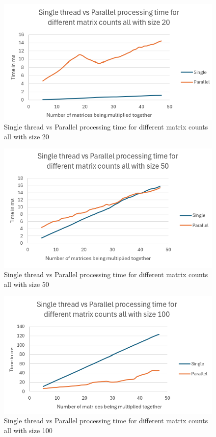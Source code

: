 \begin{figure}[H]
    \centering
    \includegraphics[width=1\columnwidth]{Figures/different_matrix_counts_size 20}
    \caption{Single thread vs Parallel processing time for different matrix counts all with size 20}
    \label{fig:different_matrix_counts_size 20}
\end{figure}

\begin{figure}[H]
    \centering
    \includegraphics[width=1\columnwidth]{Figures/different_matrix_counts_size 50}
    \caption{Single thread vs Parallel processing time for different matrix counts all with size 50}
    \label{fig:different_matrix_counts_size 50}
\end{figure}

\begin{figure}[H]
    \centering
    \includegraphics[width=1\columnwidth]{Figures/different_matrix_counts_size 100}
    \caption{Single thread vs Parallel processing time for different matrix counts all with size 100}
    \label{fig:different_matrix_counts_size 100}
\end{figure}

